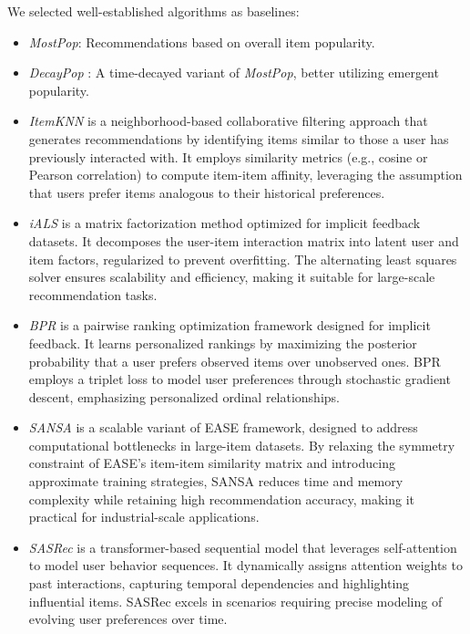 \documentclass[sigconf,authorversion,nonacm]{acmart}
\begin{document}
We selected well-established algorithms as baselines:
\begin{itemize}
  \item \textit{MostPop}: Recommendations based on overall item popularity.
  \item \textit{DecayPop} \cite{ji2020re}: A time-decayed variant of \textit{MostPop}, better utilizing emergent popularity.
  \item \textit{ItemKNN} \cite{sarwar2001item} is a neighborhood-based collaborative filtering approach that generates recommendations by identifying items similar to those a user has previously interacted with. It employs similarity metrics (e.g., cosine or Pearson correlation) to compute item-item affinity, leveraging the assumption that users prefer items analogous to their historical preferences.
  \item \textit{iALS} \cite{hu2008collaborative} is a matrix factorization method optimized for implicit feedback datasets. It decomposes the user-item interaction matrix into latent user and item factors, regularized to prevent overfitting. The alternating least squares solver ensures scalability and efficiency, making it suitable for large-scale recommendation tasks.
  \item \textit{BPR} \cite{rendle2012bpr} is a pairwise ranking optimization framework designed for implicit feedback. It learns personalized rankings by maximizing the posterior probability that a user prefers observed items over unobserved ones. BPR employs a triplet loss to model user preferences through stochastic gradient descent, emphasizing personalized ordinal relationships.
  \item \textit{SANSA} \cite{spivsak2023scalable} is a scalable variant of EASE \cite{steck2019embarrassingly} framework, designed to address computational bottlenecks in large-item datasets. By relaxing the symmetry constraint of EASE’s item-item similarity matrix and introducing approximate training strategies, SANSA reduces time and memory complexity while retaining high recommendation accuracy, making it practical for industrial-scale applications.
  \item \textit{SASRec} \cite{kang2018self} is a transformer-based sequential model that leverages self-attention to model user behavior sequences. It dynamically assigns attention weights to past interactions, capturing temporal dependencies and highlighting influential items. SASRec excels in scenarios requiring precise modeling of evolving user preferences over time.
\end{itemize}
\end{document}
